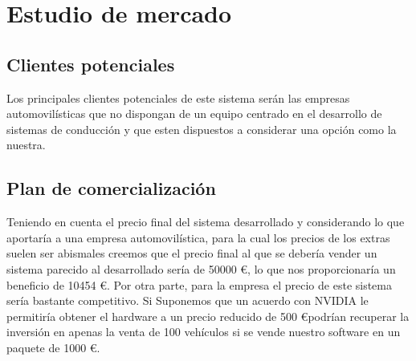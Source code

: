 \section{Estudio de mercado} \label{sec:estudioDeMercado}
\subsection{Clientes potenciales} \label{sec:clientesPotenciales}

Los principales clientes potenciales de este sistema serán las empresas automovilísticas que no dispongan de un equipo centrado en el desarrollo de sistemas de conducción y que esten dispuestos a considerar una opción como la nuestra.

\subsection{Plan de comercialización} \label{sec:planComercializacion}

Teniendo en cuenta el precio final del sistema desarrollado y considerando lo que aportaría a una empresa automovilística, para la cual los precios de los extras suelen ser abismales creemos que el precio final al que se debería vender un sistema parecido al desarrollado sería de 50000 \euro, lo que nos proporcionaría un beneficio de 10454 \euro. Por otra parte, para la empresa el precio de este sistema sería bastante competitivo. Si Suponemos que un acuerdo con NVIDIA le permitiría obtener el hardware a un precio reducido de 500 \euro podrían recuperar la inversión en apenas la venta de 100 vehículos si se vende nuestro software en un paquete de 1000 \euro.